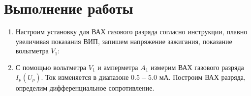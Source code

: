 \documentclass[a4paper, 12pt]{article}
\begin{document}
\section*{Выполнение работы}
\begin{enumerate}
    \item Настроим установку для ВАХ газового разряда согласно инструкции, плавно увеличивая показания ВИП, запишем напряжение
    зажигания, показание вольтметра $V_{1}$:
    \item С помощью вольтметра $V_{1}$ и амперметра $A_{1}$ измерим ВАХ газового разряда $I_{p}(U_{p})$. Ток изменяется в диапазоне $0.5 - 5.0$ мА.
    Построим ВАХ разряда, определим дифференциальное сопротивление.

\end{enumerate}
\end{document}
